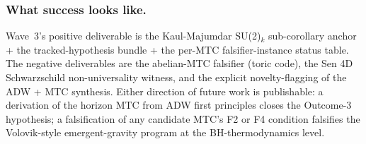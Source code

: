 \documentclass[aps,prd,twocolumn,showpacs,superscriptaddress,nofootinbib]{revtex4-2}
\begin{document}
\subsubsection*{What success looks like.}

Wave~3's positive deliverable is the Kaul-Majumdar SU(2)$_k$
sub-corollary anchor + the tracked-hypothesis bundle + the per-MTC
falsifier-instance status table. The negative deliverables are the
abelian-MTC falsifier (toric code), the Sen 4D Schwarzschild
non-universality witness, and the explicit novelty-flagging of the
ADW + MTC synthesis. Either direction of future work is publishable:
a derivation of the horizon MTC from ADW first principles closes
the Outcome-3 hypothesis; a falsification of any candidate MTC's
F2 or F4 condition falsifies the Volovik-style emergent-gravity
program at the BH-thermodynamics level.
\end{document}
